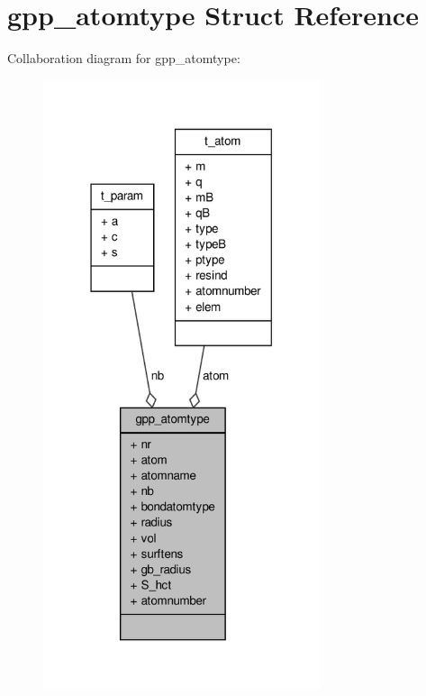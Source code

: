 \hypertarget{structgpp__atomtype}{\section{gpp\-\_\-atomtype \-Struct \-Reference}
\label{structgpp__atomtype}
}


\-Collaboration diagram for gpp\-\_\-atomtype\-:
\nopagebreak
\begin{figure}[H]
\begin{center}
\leavevmode
\includegraphics[width=230pt]{structgpp__atomtype__coll__graph}
\end{center}
\end{figure}
